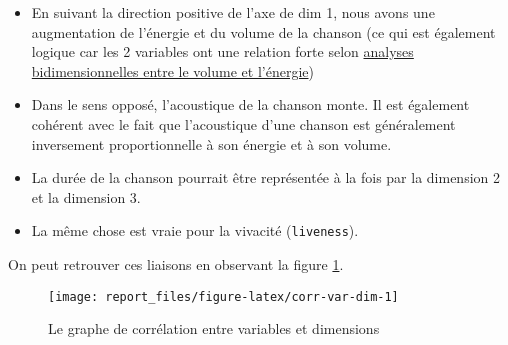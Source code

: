 \documentclass[
  11pt,
  xcolor = usenames,dvipsnames]{article}
\newcommand{\passthrough}[1]{#1}
\providecommand{\tightlist}{%
  \setlength{\itemsep}{0pt}\setlength{\parskip}{0pt}}
\begin{document}
\begin{itemize}
\tightlist
\item
  En suivant la direction positive de l'axe de dim 1, nous avons une augmentation de l'énergie et du volume de la chanson (ce qui est également logique car les 2 variables ont une relation forte selon \protect\hyperlink{volume-energy}{analyses bidimensionnelles entre le volume et l'énergie})
\item
  Dans le sens opposé, l'acoustique de la chanson monte. Il est également cohérent avec le fait que l'acoustique d'une chanson est généralement inversement proportionnelle à son énergie et à son volume.
\item
  La durée de la chanson pourrait être représentée à la fois par la dimension 2 et la dimension 3.
\item
  La même chose est vraie pour la vivacité (\passthrough{\lstinline!liveness!}).
\end{itemize}

On peut retrouver ces liaisons en observant la figure \ref{fig:corr-var-dim}.

\begin{figure}

{\centering \texttt{[image: report\_files/figure-latex/corr-var-dim-1]} 

}

\caption{Le graphe de corrélation entre variables et dimensions}\label{fig:corr-var-dim}
\end{figure}
\end{document}
